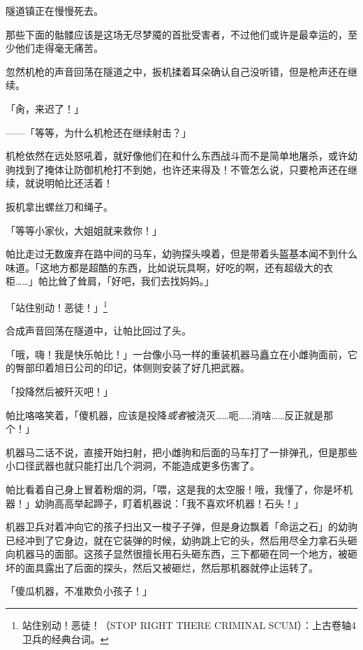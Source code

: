 隧道镇正在慢慢死去。

那些下面的骷髅应该是这场无尽梦魇的首批受害者，不过他们或许是最幸运的，至少他们走得毫无痛苦。

忽然机枪的声音回荡在隧道之中，扳机揉着耳朵确认自己没听错，但是枪声还在继续。

「肏，来迟了！」

——「等等，为什么机枪还在继续射击？」

机枪依然在远处怒吼着，就好像他们在和什么东西战斗而不是简单地屠杀，或许幼驹找到了掩体让防御机枪打不到她，也许还来得及！不管怎么说，只要枪声还在继续，就说明帕比还活着！

扳机拿出螺丝刀和绳子。

「等等小家伙，大姐姐就来救你！」

\horizonline


帕比走过无数废弃在路中间的马车，幼驹探头嗅着，但是带着头盔基本闻不到什么味道。「这地方都是超酷的东西，比如说玩具啊，好吃的啊，还有超级大的衣柜……」帕比耸了耸肩，「好吧，我们去找妈妈。」

「站住别动！恶徒！」\footnotespacefix\footnote{站住别动！恶徒！（STOP RIGHT THERE CRIMINAL SCUM）：上古卷轴4卫兵的经典台词。}

合成声音回荡在隧道中，让帕比回过了头。

「哦，嗨！我是快乐帕比！」一台像小马一样的重装机器马矗立在小雌驹面前，它的臀部印着旭日公司的印记，体侧则安装了好几把武器。

「投降然后被歼灭吧！」

帕比咯咯笑着，「傻机器，应该是投降\emph{或者}被浇灭……呃……消啥……反正就是那个！」

机器马二话不说，直接开始扫射，把小雌驹和后面的马车打了一排弹孔，但是那些小口径武器也就只能打出几个洞洞，不能造成更多伤害了。

帕比看着自己身上冒着粉烟的洞，「喂，这是我的太空服！哦，我懂了，你是坏机器！」幼驹高高举起蹄子，盯着机器说：「我不喜欢坏机器！石头！」

机器卫兵对着冲向它的孩子扫出又一梭子子弹，但是身边飘着「命运之石」的幼驹已经冲到了它身边，就在它装弹的时候，幼驹跳上它的头，然后用尽全力拿石头砸向机器马的面部。这孩子显然很擅长用石头砸东西，三下都砸在同一个地方，被砸坏的面具露出了后面的探头，然后又被砸烂，然后那机器就停止运转了。

「傻瓜机器，不准欺负小孩子！」

